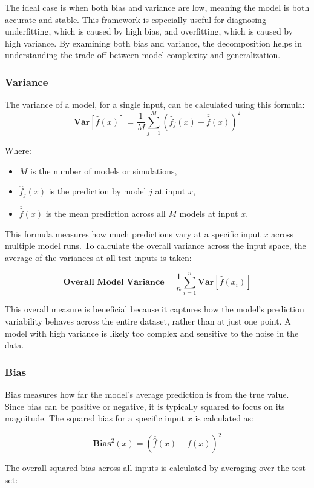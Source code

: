 The ideal case is when both bias and variance are low, meaning the model is both accurate and stable. This framework is especially useful for diagnosing underfitting, which is caused by high bias, and overfitting, which is caused by high variance. By examining both bias and variance, the decomposition helps in understanding the trade-off between model complexity and generalization.

\subsubsection{Variance}
The variance of a model, for a single input, can be calculated using this formula:
$$
\textbf{Var}[\hat{f}(x)] = \frac{1}{M} \sum_{j=1}^{M} (\hat{f}_j(x) - \overline{\hat{f}}(x))^2
$$

Where:
\begin{itemize}
	\item $M$ is the number of models or simulations,
	\item $\hat{f}_j(x)$ is the prediction by model $j$ at input $x$,
	\item $\overline{\hat{f}}(x)$ is the mean prediction across all $M$ models at input $x$.
\end{itemize}

This formula measures how much predictions vary at a specific input $x$ across multiple model runs. To calculate the overall variance across the input space, the average of the variances at all test inputs is taken:

$$
\textbf{Overall Model Variance} = \frac{1}{n} \sum_{i=1}^{n} \textbf{Var}[\hat{f}(x_i)]
$$

This overall measure is beneficial because it captures how the model’s prediction variability behaves across the entire dataset, rather than at just one point. A model with high variance is likely too complex and sensitive to the noise in the data.

\subsubsection{Bias}
Bias measures how far the model’s average prediction is from the true value. Since bias can be positive or negative, it is typically squared to focus on its magnitude. The squared bias for a specific input $x$ is calculated as:

$$
\textbf{Bias}^2(x) = (\overline{\hat{f}}(x) - f(x))^2
$$

The overall squared bias across all inputs is calculated by averaging over the test set:

